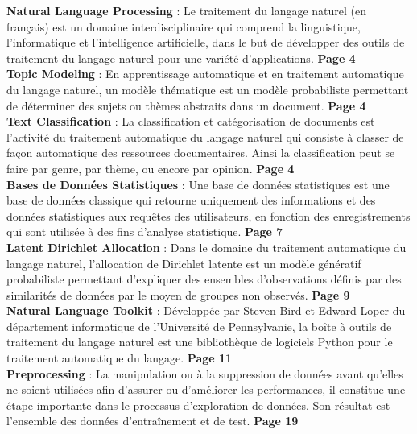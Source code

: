 \documentclass[a4paper,french,12pt]{article}
\begin{document}
\textbf{Natural Language Processing} : Le traitement du langage naturel (en français) est un domaine interdisciplinaire qui comprend la linguistique, l'informatique et l'intelligence artificielle, dans le but de développer des outils de traitement du langage naturel pour une variété d'applications. \textbf{Page 4}\\

\textbf{Topic Modeling} : En apprentissage automatique et en traitement automatique du langage naturel, un modèle thématique est un modèle probabiliste permettant de déterminer des sujets ou thèmes abstraits dans un document. \textbf{Page 4}\\

\textbf{Text Classification} : La classification et catégorisation de documents est l'activité du traitement automatique du langage naturel qui consiste à classer de façon automatique des ressources documentaires. Ainsi la classification peut se faire par genre, par thème, ou encore par opinion. \textbf{Page 4}\\

\textbf{Bases de Données Statistiques} : Une base de données statistiques est une base de données classique qui retourne uniquement des informations et des données statistiques aux requêtes des utilisateurs, en fonction des enregistrements qui sont utilisée à des fins d'analyse statistique. \textbf{Page 7}\\

\textbf{Latent Dirichlet Allocation} : Dans le domaine du traitement automatique du langage naturel, l’allocation de Dirichlet latente est un modèle génératif probabiliste permettant d’expliquer des ensembles d’observations définis par des similarités de données par le moyen de groupes non observés. \textbf{Page 9}\\

\textbf{Natural Language Toolkit} : Développée par Steven Bird et Edward Loper du département informatique de l'Université de Pennsylvanie, la boîte à outils de traitement du langage naturel est une bibliothèque de logiciels Python pour le traitement automatique du langage. \textbf{Page 11}\\

\textbf{Preprocessing} : La manipulation ou à la suppression de données avant qu'elles ne soient utilisées afin d'assurer ou d'améliorer les performances, il constitue une étape importante dans le processus d'exploration de données. Son résultat est l'ensemble des données d'entraînement et de test. \textbf{Page 19}\\
\end{document}

